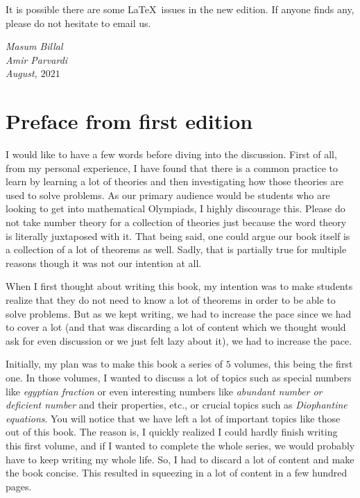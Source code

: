 \documentclass[leqno,14pt,DIV=calc,toc=index]{scrbook}
\begin{document}
It is possible there are some \LaTeX\ issues in the new edition. If anyone finds any, please do not hesitate to email us.

\begin{flushright}
	\itshape Masum Billal\\
	Amir Parvardi\\
	August, $2021$
\end{flushright}

\newpage
\section*{Preface from first edition}

I would like to have a few words before diving into the discussion. First of all, from my personal experience, I have found that there is a common practice to learn by learning a lot of theories and then investigating how those theories are used to solve problems. As our primary audience would be students who are looking to get into mathematical Olympiads, I highly discourage this. Please do not take number theory for a collection of theories just because the word theory is literally juxtaposed with it. That being said, one could argue our book itself is a collection of a lot of theorems as well. Sadly, that is partially true for multiple reasons though it was not our intention at all.


When I first thought about writing this book, my intention was to make students realize that they do not need to know a lot of theorems in order to be able to solve problems. But as we kept writing, we had to increase the pace since we had to cover a lot (and that was discarding a lot of content which we thought would ask for even discussion or we just felt lazy about it), we had to increase the pace.


Initially, my plan was to make this book a series of $5$ volumes, this being the first one. In those volumes, I wanted to discuss a lot of topics such as special numbers like \textit{egyptian fraction} or even interesting numbers like \textit{abundant number or deficient number} and their properties, etc., or crucial topics such as \textit{Diophantine equations}. You will notice that we have left a lot of important topics like those out of this book. The reason is, I quickly realized I could hardly finish writing this first volume, and if I wanted to complete the whole series, we would probably have to keep writing my whole life. So, I had to discard a lot of content and make the book concise. This resulted in squeezing in a lot of content in a few hundred pages.
\end{document}
